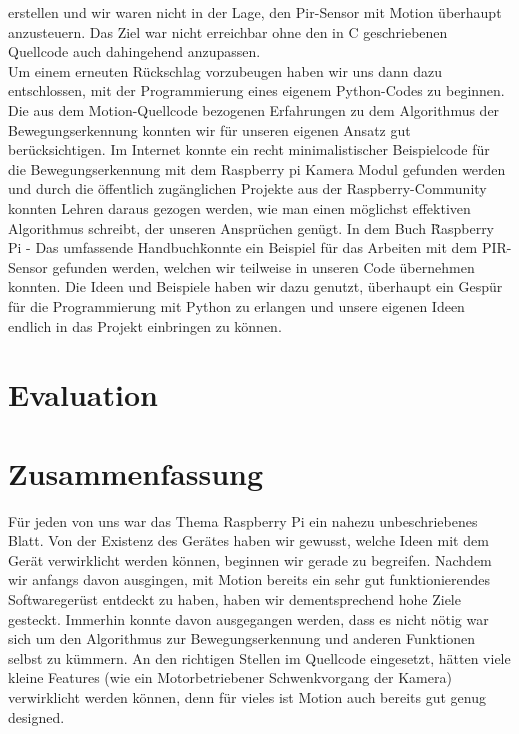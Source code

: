 \documentclass[journal]{IEEEtran}
\begin{document}
erstellen und wir waren nicht in der Lage, den Pir-Sensor mit Motion überhaupt anzusteuern. Das Ziel war nicht erreichbar ohne den in C geschriebenen Quellcode auch dahingehend anzupassen. \\ Um einem erneuten Rückschlag vorzubeugen haben wir uns dann dazu entschlossen, mit der Programmierung eines eigenem Python-Codes zu beginnen. Die aus dem Motion-Quellcode bezogenen Erfahrungen zu dem Algorithmus der Bewegungserkennung konnten wir für unseren eigenen Ansatz gut berücksichtigen. Im Internet konnte ein recht minimalistischer Beispielcode für die Bewegungserkennung mit dem Raspberry pi Kamera Modul gefunden werden\cite{motioncode} und durch die öffentlich zugänglichen Projekte aus der Raspberry-Community konnten Lehren daraus gezogen werden, wie man einen möglichst effektiven Algorithmus schreibt, der unseren Ansprüchen genügt. In dem Buch \"Raspberry Pi - Das umfassende Handbuch\" konnte ein Beispiel für das Arbeiten mit dem PIR-Sensor gefunden werden\cite[S. 495]{Raspi}, welchen wir teilweise in unseren Code übernehmen konnten. Die Ideen und Beispiele haben wir dazu genutzt, überhaupt ein Gespür für die Programmierung mit Python zu erlangen und unsere eigenen Ideen endlich in das Projekt einbringen zu können. \\



\section{Evaluation}




\section{Zusammenfassung}
Für jeden von uns war das Thema Raspberry Pi ein nahezu unbeschriebenes Blatt. Von der Existenz des Gerätes haben wir gewusst, welche Ideen mit dem Gerät verwirklicht werden können, beginnen wir gerade zu begreifen. Nachdem wir anfangs davon ausgingen, mit Motion bereits ein sehr gut funktionierendes Softwaregerüst entdeckt zu haben, haben wir dementsprechend hohe Ziele gesteckt. Immerhin konnte davon ausgegangen werden, dass es nicht nötig war sich um den Algorithmus zur Bewegungserkennung und anderen Funktionen selbst zu kümmern. An den richtigen Stellen im Quellcode eingesetzt, hätten viele kleine Features (wie ein Motorbetriebener Schwenkvorgang der Kamera) verwirklicht werden können, denn für vieles ist Motion auch bereits gut genug designed. 




\printbibliography
\end{document}
